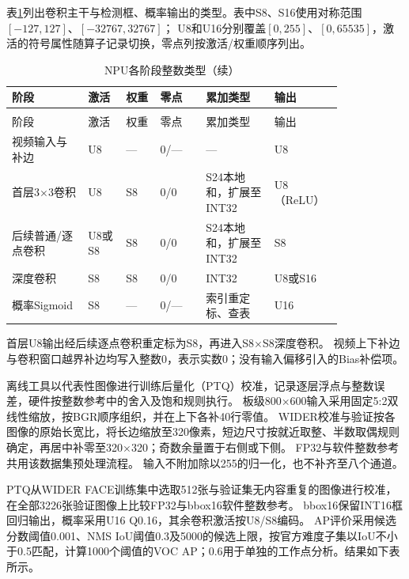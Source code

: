 表\ref{tab:npu-stage-types}列出卷积主干与检测框、概率输出的类型。表中S8、S16使用对称范围$[-127,127]$、$[-32767,32767]$；
U8和U16分别覆盖$[0,255]$、$[0,65535]$，激活的符号属性随算子记录切换，零点列按激活/权重顺序列出。

\begin{reporttable}
\begin{longtable}{@{}p{0.20\linewidth}p{0.10\linewidth}p{0.09\linewidth}p{0.12\linewidth}p{0.18\linewidth}p{0.14\linewidth}@{}}
\caption{NPU各阶段整数类型}\label{tab:npu-stage-types}\\
\toprule
阶段 & 激活 & 权重 & 零点 & 累加类型 & 输出 \\
\midrule
\endfirsthead
\caption[]{NPU各阶段整数类型（续）}\\
\toprule
阶段 & 激活 & 权重 & 零点 & 累加类型 & 输出 \\
\midrule
\endhead
\bottomrule
\endfoot
视频输入与补边 & U8 & --- & 0/--- & --- & U8 \\
首层3$\times$3卷积 & U8 & S8 & 0/0 & S24本地和，扩展至INT32 & U8（ReLU） \\
后续普通/逐点卷积 & U8或S8 & S8 & 0/0 & S24本地和，扩展至INT32 & S8 \\
深度卷积 & S8 & S8 & 0/0 & INT32 & U8或S16 \\
概率Sigmoid & S8 & --- & 0/--- & 索引重定标、查表 & U16 \\
\end{longtable}
\end{reporttable}

首层U8输出经后续逐点卷积重定标为S8，再进入S8$\times$S8深度卷积。
视频上下补边与卷积窗口越界补边均写入整数0，表示实数0；没有输入偏移引入的Bias补偿项。

离线工具以代表性图像进行训练后量化（PTQ）校准\cite{krishnamoorthi2018quantization}，记录逐层浮点与整数误差，硬件按整数参考中的舍入及饱和规则执行。
板级800$\times$600输入采用固定5:2双线性缩放，按BGR顺序组织，并在上下各补40行零值。
WIDER校准与验证按各图像的原始长宽比，将长边缩放至320像素，短边尺寸按就近取整、半数取偶规则确定，再居中补零至320$\times$320；奇数余量置于右侧或下侧。
FP32与软件整数参考共用该数据集预处理流程。
输入不附加除以255的归一化，也不补齐至八个通道。

PTQ从WIDER FACE训练集中选取512张与验证集无内容重复的图像进行校准，在全部3226张验证图像上比较FP32与bbox16软件整数参考。
bbox16保留INT16框回归输出，概率采用U16 Q0.16，其余卷积激活按U8/S8编码。
AP评价采用候选分数阈值0.001、NMS IoU阈值0.3及5000的候选上限，按官方难度子集以IoU不小于0.5匹配，计算1000个阈值的VOC AP；0.6用于单独的工作点分析。结果如下表所示。

